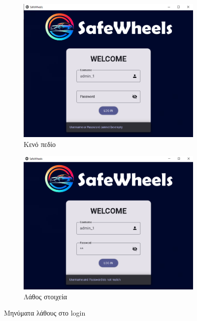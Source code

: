 \documentclass{llncs}
\begin{document}
\begin{figure}
    \centering
    \begin{subfigure}{0.45\linewidth}
        \includegraphics[width=\linewidth]{images/login_empty.png}
        \caption{Κενό πεδίο}
        \label{fig:empty}
    \end{subfigure}
    \begin{subfigure}{0.45\linewidth}
        \includegraphics[width=\linewidth]{images/login_dont_match.png}
        \caption{Λάθος στοιχεία}
        \label{fig:match}
    \end{subfigure}
    \caption{Μηνύματα λάθους στο login}
    \label{fig:errors}
\end{figure}
        
\end{document}
